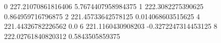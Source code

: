 0 227.21070861816406 5.7674407958984375
1 222.3082275390625 0.864959716796875
2 221.45733642578125 0.014068603515625
4 221.44326782226562 0.0
6 221.1160430908203 -0.3272247314453125
8 222.02761840820312 0.5843505859375
